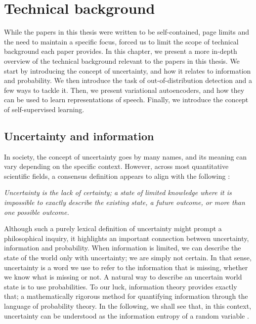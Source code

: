 

\chapter[technical background]{Technical background}\label{chp:technical-background}

While the papers in this thesis were written to be self-contained, page limits and the need to maintain a specific focus, forced us to limit the scope of technical background each paper provides. In this chapter, we present a more in-depth overview of the technical background relevant to the papers in this thesis. 
We start by introducing the concept of uncertainty, and how it relates to information and probability. We then introduce the task of out-of-distribution detection and a few ways to tackle it.
Then, we present variational autoencoders, and how they can be used to learn representations of speech. Finally, we introduce the concept of self-supervised learning.


\section{Uncertainty and information}

In society, the concept of uncertainty goes by many names, and its meaning can vary depending on the specific context. However, across most quantitative scientific fields, a consensus definition appears to align with the following \cite{hubbard_how_2014}:
%
\begin{center}
    \textit{Uncertainty is the lack of certainty; a state of limited knowledge where it is impossible to exactly describe the existing state, a future outcome, or more than one possible outcome.}
\end{center}
%
Although such a purely lexical definition of uncertainty might prompt a philosophical inquiry, it highlights an important connection between uncertainty, information and probability. When information is limited, we can describe the state of the world only with uncertainty; we are simply not certain. In that sense, uncertainty is a word we use to refer to the information that is missing, whether we know what is missing or not. 
A natural way to describe an uncertain world state is to use probabilities. To our luck, information theory provides exactly that; a mathematically rigorous method for quantifying information through the language of probability theory. In the following, we shall see that, in this context, uncertainty can be understood as the information entropy of a random variable \cite{mackay_information_2003}. 


